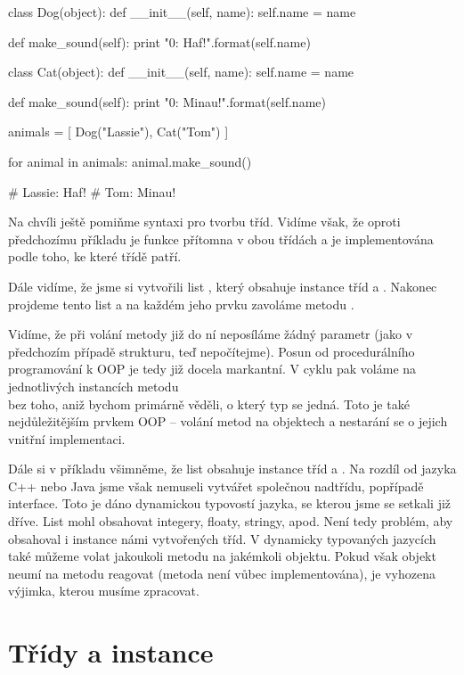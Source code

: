 \begin{python}
class Dog(object):
    def __init__(self, name):
        self.name = name

    def make_sound(self):
        print "{0}: Haf!".format(self.name)


class Cat(object):
    def __init__(self, name):
        self.name = name

    def make_sound(self):
        print "{0}: Minau!".format(self.name)

animals = [ Dog("Lassie"), Cat("Tom") ]

for animal in animals:
     animal.make_sound()

# Lassie: Haf!
# Tom: Minau!
\end{python}

Na chvíli ještě pomiňme syntaxi pro tvorbu tříd. Vidíme však, že oproti předchozímu příkladu je funkce
 přítomna v obou třídách a je implementována podle toho, ke které třídě patří.

Dále vidíme, že jsme si vytvořili list , který obsahuje instance tříd  a .
Nakonec projdeme tento list a na každém jeho prvku zavoláme metodu .

Vidíme, že při volání metody  již do ní neposíláme žádný parametr (jako v předchozím případě
strukturu,  teď nepočítejme).
Posun od procedurálního programování k OOP je tedy již docela markantní. V cyklu 
pak voláme na jednotlivých instancích metodu 
\\
 bez toho, aniž bychom primárně věděli, o který
typ se jedná. Toto je také nejdůležitějším prvkem OOP -- volání metod na objektech a nestarání se o jejich
vnitřní implementaci.

Dále si v příkladu všimněme, že list  obsahuje instance tříd  a . Na rozdíl
od jazyka C++ nebo Java jsme však nemuseli vytvářet společnou nadtřídu, popřípadě interface. Toto je dáno
dynamickou typovostí jazyka, se kterou jsme se setkali již dříve. List mohl obsahovat integery, floaty,
stringy, apod. Není tedy problém, aby obsahoval i instance námi vytvořených tříd. V dynamicky typovaných
jazycích také můžeme volat jakoukoli metodu na jakémkoli objektu. Pokud však objekt neumí na metodu reagovat
(metoda není vůbec implementována), je vyhozena výjimka, kterou musíme zpracovat.


\section{Třídy a instance}

